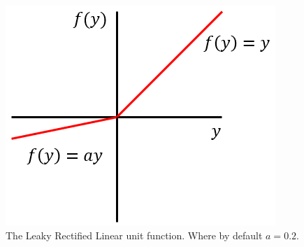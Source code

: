 \begin{figure} [!htb]
    \centering
    \includegraphics[scale=0.5]{figuren/fig4.png}
    \caption{The Leaky Rectified Linear unit function. Where by default $a=0.2$.}
    \label{fig:leakyrelu}
\end{figure}

